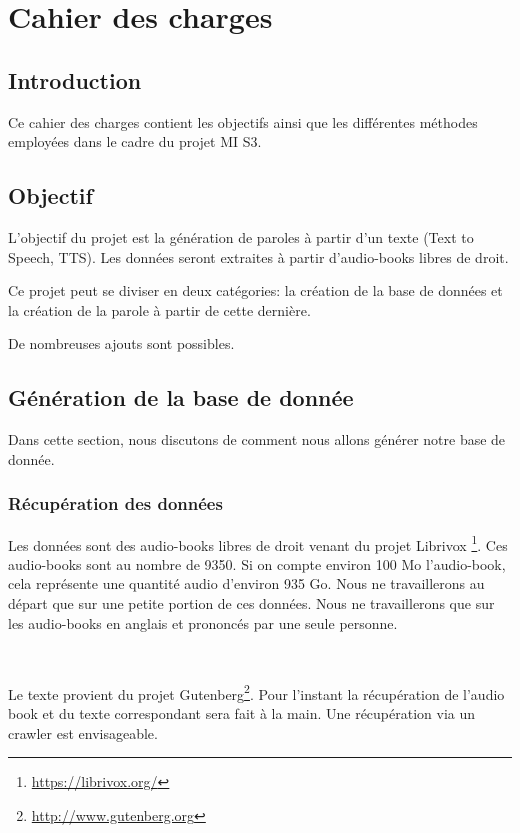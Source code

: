 \chapter{Cahier des charges}
	
	\section*{Introduction}

		Ce cahier des charges contient les objectifs ainsi que les différentes
	méthodes employées dans le cadre du projet MI S3.
	
	\section{Objectif}
	
		L'objectif du projet est la génération de paroles à partir d'un texte
	(Text to Speech, TTS). Les données seront extraites à partir d'audio-books
	libres de droit.
	
		Ce projet peut se diviser en deux catégories: la création de la base de
	données et la création de la parole à partir de cette dernière.
	
		De nombreuses ajouts sont possibles.
		
	\section{Génération de la base de donnée}
	
	Dans cette section, nous discutons de comment nous allons générer notre
	base de donnée.
	
		\subsection{Récupération des données}
		
		Les données sont des audio-books libres de droit venant du projet Librivox
	\footnote{\url{https://librivox.org/}}.
	Ces audio-books sont au nombre de 9350. Si on compte environ 100 Mo 
	l'audio-book, cela représente une quantité audio d'environ 935 Go.
	Nous ne travaillerons au départ que sur une petite portion de ces données.
	Nous ne travaillerons que sur les audio-books en anglais et prononcés par une
	seule personne.
	
	~
	
	Le texte provient du projet 
	Gutenberg\footnote{\url{http://www.gutenberg.org}}.
	Pour l'instant la récupération de l'audio book et du texte correspondant
	sera fait à la main. Une récupération via un crawler est envisageable.
	
